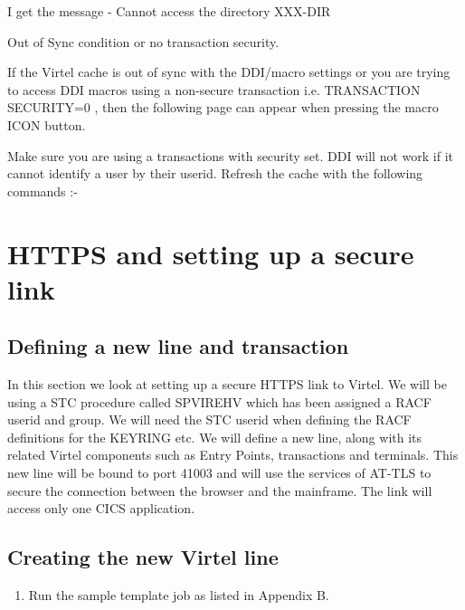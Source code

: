 \documentclass[letterpaper,10pt,english]{sphinxmanual}
\begin{document}

I get the message - Cannot access the directory XXX-DIR



Out of Sync condition or no transaction security.

If the Virtel cache is out of sync with the DDI/macro settings or you are trying to access DDI macros using a non-secure transaction i.e. TRANSACTION SECURITY=0 ,  then the following page can appear when pressing the macro ICON button.


Make sure you are using a transactions with security set. DDI will not work if it cannot identify a user by their userid. Refresh the cache with the following commands :-

\begin{sphinxVerbatim}[commandchars=\\\{\}]
 
\end{sphinxVerbatim}


\chapter{HTTPS and setting up a secure link}
\label{\detokenize{TN202002:https-and-setting-up-a-secure-link}}

\section{Defining a new line and transaction}
\label{\detokenize{TN202002:defining-a-new-line-and-transaction}}
In this section we look at setting up a secure HTTPS link to Virtel. We will be using a STC procedure called SPVIREHV which has been assigned a RACF userid and group. We will need the STC userid when defining the RACF definitions for the KEYRING etc. We will define a new line, along with its related Virtel components such as Entry Points, transactions and terminals. This new line will be bound to port 41003 and will use the services of AT-TLS to secure the connection between the browser and the mainframe. The link will access only one CICS application.


\section{Creating the new Virtel line}
\label{\detokenize{TN202002:creating-the-new-virtel-line}}\begin{enumerate}
\def\theenumi{\arabic{enumi}}
\def\labelenumi{\theenumi .}
\makeatletter\def\p@enumii{\p@enumi \theenumi .}\makeatother
\item {} 
Run the sample template job as listed in Appendix B.

\end{enumerate}
\end{document}

